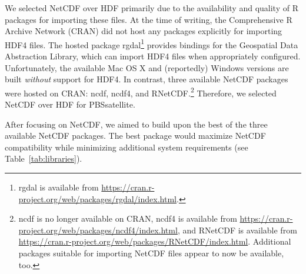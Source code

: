 \documentclass[11pt]{report}
\begin{document}
We selected NetCDF over HDF primarily due to the availability and quality of R packages for importing these files.
At the time of writing, the Comprehensive R Archive Network (CRAN) did not host any packages explicitly for importing HDF4 files.
The hosted package rgdal\footnote{
  rgdal is available from \url{https://cran.r-project.org/web/packages/rgdal/index.html}.}
provides bindings for the Geospatial Data Abstraction Library, which can import HDF4 files when appropriately configured.
Unfortunately, the available Mac OS X and (reportedly) Windows versions are built \textit{without} support for HDF4.
In contrast, three available NetCDF packages were hosted on CRAN: ncdf, ncdf4, and RNetCDF.\footnote{
  ncdf is no longer available on CRAN, ncdf4 is available from \url{https://cran.r-project.org/web/packages/ncdf4/index.html}, and RNetCDF is available from \url{https://cran.r-project.org/web/packages/RNetCDF/index.html}.
  Additional packages suitable for importing NetCDF files appear to now be available, too.}
Therefore, we selected NetCDF over HDF for PBSsatellite.

After focusing on NetCDF, we aimed to build upon the best of the three available NetCDF packages.
The best package would maximize NetCDF compatibility while minimizing additional system requirements (see Table~\ref{tab:libraries}).
\end{document}
